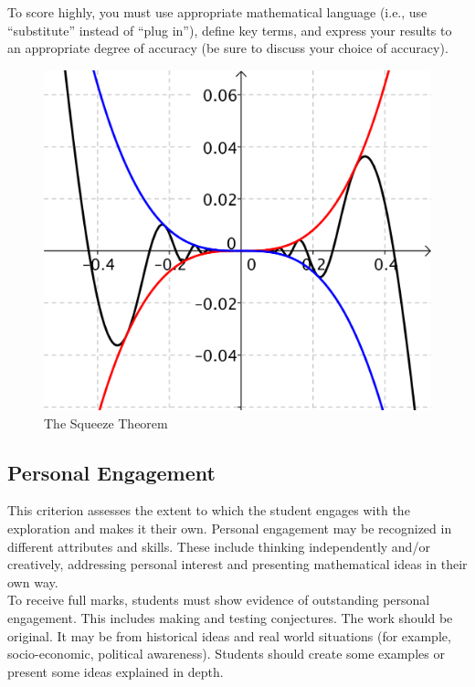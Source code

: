 \documentclass[11pt]{article}
\begin{document}
To score highly, you must use appropriate mathematical language (i.e., use ``substitute'' instead of ``plug in''), define key terms, and express your results to an appropriate degree of accuracy (be sure to discuss your choice of accuracy).

\begin{figure}[H]
	\centering
	\includegraphics[scale=0.5]{limit}
	\caption{The Squeeze Theorem \cite{DBHS2}}
	\label{fig:squeeze}
\end{figure}

\subsection{Personal Engagement}
This criterion assesses the extent to which the student engages with the exploration and makes it their own. Personal engagement may be recognized in different attributes and skills. These include thinking independently and/or creatively, addressing personal interest and presenting mathematical ideas in their own way.\\

To receive full marks, students must show evidence of outstanding personal engagement. This includes making and testing conjectures. The work should be original. It may be from historical ideas and real world situations (for example, socio-economic, political awareness). Students should create some examples or present some ideas explained in depth.
\end{document}
